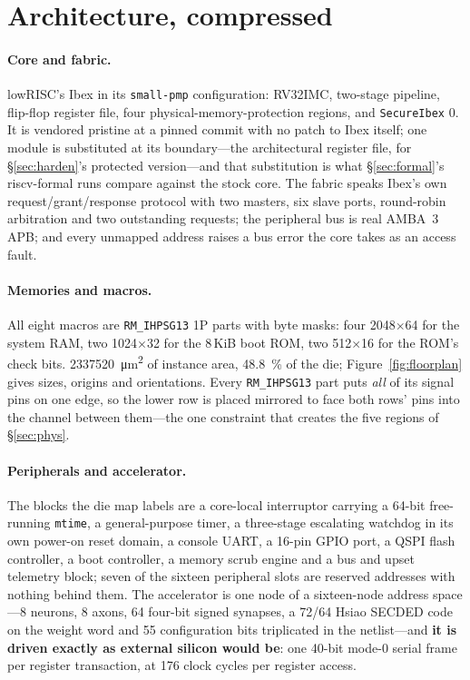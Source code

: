 \documentclass[11pt,a4paper]{article}
\newcommand{\file}[1]{\texttt{\small #1}}
\begin{document}
\section{Architecture, compressed}
\label{sec:arch}

\paragraph{Core and fabric.} lowRISC's Ibex in its \texttt{small-pmp}
configuration: RV32IMC, two-stage pipeline, flip-flop register file,
four physical-memory-protection regions, and \texttt{SecureIbex}
\num{0}. It is vendored pristine at a pinned commit with no patch to
Ibex itself; one module is substituted at its boundary---the
architectural register file, for \S\ref{sec:harden}'s protected
version---and that substitution is what \S\ref{sec:formal}'s
riscv-formal runs compare against the stock core. The fabric speaks
Ibex's own request/grant/response protocol with two masters, six slave
ports, round-robin arbitration and two outstanding requests; the
peripheral bus is real AMBA~3 APB; and every unmapped address raises a
bus error the core takes as an access fault.

\paragraph{Memories and macros.} All eight macros are \file{RM\_IHPSG13}
1P parts with byte masks: four \num{2048}$\times$\num{64} for the
system RAM, two \num{1024}$\times$\num{32} for the \num{8}\,KiB boot
ROM, two \num{512}$\times$\num{16} for the ROM's check bits.
\SI{2337520}{\um\squared} of instance area,
\SI{48.8}{\percent} of the die; Figure~\ref{fig:floorplan} gives sizes,
origins and orientations. Every \file{RM\_IHPSG13} part puts \emph{all}
of its signal pins on one edge, so the lower row is placed mirrored to
face both rows' pins into the channel between them---the one constraint
that creates the five regions of \S\ref{sec:phys}.

\paragraph{Peripherals and accelerator.} The blocks the die map labels
are a core-local interruptor carrying a \num{64}-bit free-running
\texttt{mtime}, a general-purpose timer, a three-stage escalating
watchdog in its own power-on reset domain, a console UART, a
\num{16}-pin GPIO port, a QSPI flash controller, a boot controller, a
memory scrub engine and a bus and upset telemetry block; seven of the
sixteen peripheral slots are reserved addresses with nothing behind
them. The accelerator is one node of a sixteen-node address space---\num{8}
neurons, \num{8} axons, \num{64} four-bit signed synapses, a
\num{72}/\num{64} Hsiao SECDED code on the weight word and \num{55}
configuration bits triplicated in the netlist---and \textbf{it is
driven exactly as external silicon would be}: one \num{40}-bit mode-0
serial frame per register transaction, at \num{176} clock cycles per
register access.
\end{document}
